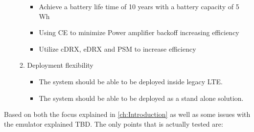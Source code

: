 \begin{itemize}
\begin{enumerate}[resume]
		\begin{itemize}
		\item  Achieve a battery life time of 10 years with a battery capacity of 5 Wh
		\item Using \gls{CE} to minimize Power amplifier backoff increasing efficiency
		\item Utilize \gls{cDRX}, \gls{eDRX} and \gls{PSM} to increase efficiency
	\end{itemize}
	\item Deployment flexibility
		\begin{itemize}
		\item The system should be able to be deployed inside legacy \gls{LTE}.
		\item The system should be able to be deployed as a stand alone solution.
		\end{itemize}
	\end{enumerate}
\end{itemize}


Based on both the focus explained in \autoref{ch:Introduction} as well as some issues with the emulator explained TBD. The only points that is actually tested are: 


